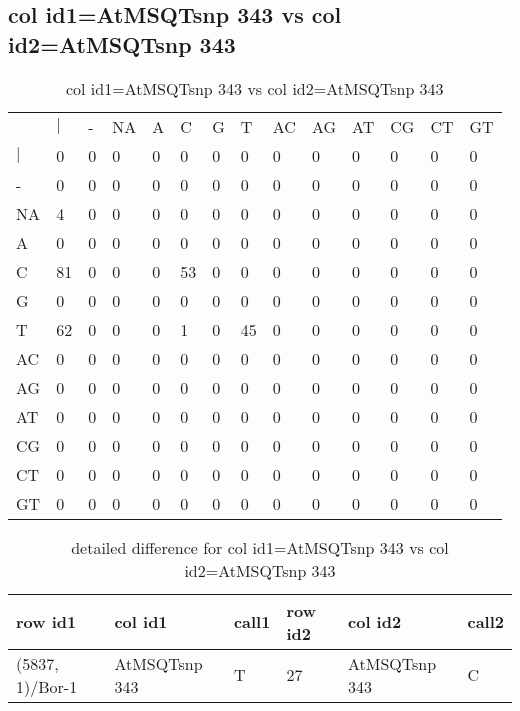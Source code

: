 \subsection{col id1=AtMSQTsnp 343 vs col id2=AtMSQTsnp 343}
\begin{center}
\begin{longtable}{|l|l|l|l|l|l|l|l|l|l|l|l|l|l|}
\caption{col id1=AtMSQTsnp 343 vs col id2=AtMSQTsnp 343} \label{table_dm676}\\
\hline
\\
\hline
&$|$&-&NA&A&C&G&T&AC&AG&AT&CG&CT&GT\\
$|$&0&0&0&0&0&0&0&0&0&0&0&0&0\\
-&0&0&0&0&0&0&0&0&0&0&0&0&0\\
NA&4&0&0&0&0&0&0&0&0&0&0&0&0\\
A&0&0&0&0&0&0&0&0&0&0&0&0&0\\
C&81&0&0&0&53&0&0&0&0&0&0&0&0\\
G&0&0&0&0&0&0&0&0&0&0&0&0&0\\
T&62&0&0&0&1&0&45&0&0&0&0&0&0\\
AC&0&0&0&0&0&0&0&0&0&0&0&0&0\\
AG&0&0&0&0&0&0&0&0&0&0&0&0&0\\
AT&0&0&0&0&0&0&0&0&0&0&0&0&0\\
CG&0&0&0&0&0&0&0&0&0&0&0&0&0\\
CT&0&0&0&0&0&0&0&0&0&0&0&0&0\\
GT&0&0&0&0&0&0&0&0&0&0&0&0&0\\
\hline
\end{longtable}
\end{center}

\begin{center}
\begin{longtable}{|l|l|l|l|l|l|}
\caption{detailed difference for col id1=AtMSQTsnp 343 vs col id2=AtMSQTsnp 343} \label{table_dm677}\\
\hline
row id1&col id1&call1&row id2&col id2&call2\\
\hline
(5837, 1)/Bor-1&AtMSQTsnp 343&T&27&AtMSQTsnp 343&C\\
\hline
\end{longtable}
\end{center}


